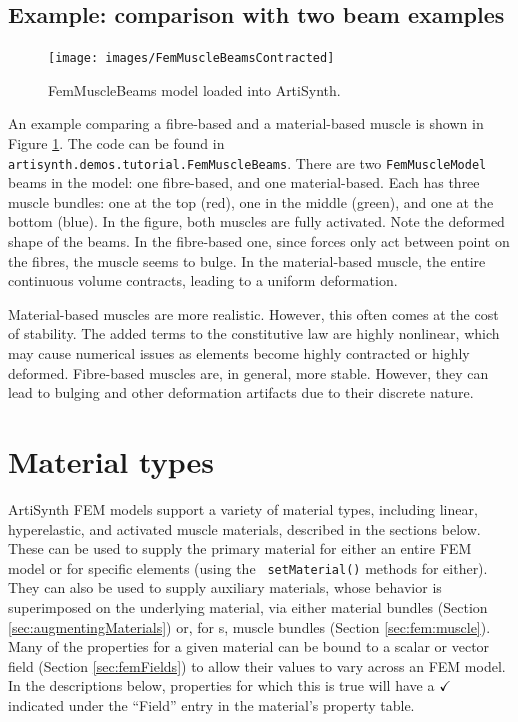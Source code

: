 \subsection{Example: comparison with two beam examples}
\label{FemMuscleBeams:sec}

\begin{figure}[ht]
	\centering
	\texttt{[image: images/FemMuscleBeamsContracted]}
	\caption{FemMuscleBeams model loaded into ArtiSynth.}
	\label{fig:fem:musclebeams}
\end{figure}

An example comparing a fibre-based and a material-based muscle is shown 
in Figure \ref{fig:fem:musclebeams}.  The code can be found in 
{\tt artisynth.demos.tutorial.FemMuscleBeams}.  There are two 
{\tt FemMuscleModel} beams in the model: one fibre-based, and one 
material-based.  Each has three muscle bundles: one at the top (red),
one in the middle (green), and one at the bottom (blue).  In the figure,
both muscles are fully activated.  Note the deformed shape of the beams.
In the fibre-based one, since forces only act between point on the fibres,
the muscle seems to bulge.  In the material-based muscle, the entire
continuous volume contracts, leading to a uniform deformation.  

Material-based muscles are more realistic.  However, this often comes at the cost
of stability.  The added terms to the constitutive law are highly nonlinear,
which may cause numerical issues as elements become highly contracted or
highly deformed.  Fibre-based muscles are, in general, more stable.  However,
they can lead to bulging and other deformation artifacts due to their discrete
nature.

\section{Material types}
\label{MaterialTypes:sec}

ArtiSynth FEM models support a variety of material types, including
linear, hyperelastic, and activated muscle materials, described in the
sections below. These can be used to supply the primary material for
either an entire FEM model or for specific elements (using the {\tt
setMaterial()} methods for either). They can also be used to supply
auxiliary materials, whose behavior is superimposed on the underlying
material, via either material bundles
(Section \ref{sec:augmentingMaterials}) or,
for s, muscle bundles
(Section \ref{sec:fem:muscle}). Many of the properties for a given
material can be bound to a scalar or vector field
(Section \ref{sec:femFields}) to allow their values to vary across an
FEM model. In the descriptions below, properties for which this is
true will have a $\check$ indicated under the ``Field'' entry in the
material's property table.

